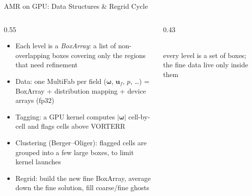 \documentclass[10pt,aspectratio=43]{beamer}
\begin{document}
\begin{frame}{AMR on GPU: Data Structures \& Regrid Cycle}
  \begin{columns}[T]
    \begin{column}{0.55\textwidth}
      \begin{itemize}\small
        \item Each level is a \emph{BoxArray}: a list of non-overlapping boxes covering only the regions that need refinement
        \item Data: one MultiFab per field ($\boldsymbol{\omega}$, $\mathbf{u}_f$, $p$, \dots) = BoxArray + distribution mapping + device arrays (fp32)
        \item Tagging: a GPU kernel computes $|\boldsymbol{\omega}|$ cell-by-cell and flags cells above VORTERR
        \item Clustering (Berger--Oliger): flagged cells are grouped into a few large boxes, to limit kernel launches
        \item Regrid: build the new fine BoxArray, average down the fine solution, fill coarse/fine ghosts
      \end{itemize}
    \end{column}
    \begin{column}{0.43\textwidth}
      \centering
      \\[0.1cm]
      {\scriptsize every level is a set of boxes; the fine data live only inside them}
    \end{column}
  \end{columns}
\end{frame}
\end{document}
